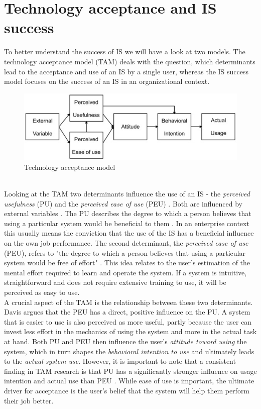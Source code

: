 \documentclass[
	english,
	ruledheaders=section,%
	class=report,%
	thesis={type=bachelor},%
	accentcolor=1b,%
	custommargins=true,%
	marginpar=false,%
	parskip=half-,%
	fontsize=11pt,%
	DIV=14,
]{tudapub}
\begin{document}
\section{Technology acceptance and IS success}
To better understand the success of IS we will have a look at two models. The technology acceptance model (TAM) \parencite{Davis1989} deals with the question, which determinants lead to the acceptance and use of an IS by a single user, whereas the IS success model \parencite{DeloneMcLean2003ISSuccessTenYearUpdate} focuses on the success of an IS in an organizational context.
\begin{figure}[h!]
    \includegraphics[width=1\linewidth]{images/TAM.png}
    \caption{Technology acceptance model}
    \label{fig:enter-label}
\end{figure}
\\
Looking at the TAM two determinants influence the use of an IS - the \textit{perceived usefulness} (PU) and the \textit{perceived ease of use} (PEU) \parencite{Davis1989}. Both are influenced by external variables \parencite{Davis1989}. The PU describes the degree to which a person believes that using a particular system would be beneficial to them \parencite{Davis1989}. In an enterprise context this usually means the conviction that the use of the IS has a beneficial influence on the own job performance. The second determinant, the \textit{perceived ease of use} (PEU), refers to "the degree to which a person believes that using a particular system would be free of effort" \parencite[p.~320]{Davis1989}. This idea relates to the user's estimation of the mental effort required to learn and operate the system. If a system is intuitive, straightforward and does not require extensive training to use, it will be perceived as easy to use.\\ A crucial aspect of the TAM is the relationship between these two determinants. Davis argues that the PEU has a direct, positive influence on the PU. A system that is easier to use is also perceived as more useful, partly because the user can invest less effort in the mechanics of using the system and more in the actual task at hand. Both PU and PEU then influence the user's \textit{attitude toward using} the system, which in turn shapes the \textit{behavioral intention to use} and ultimately leads to the \textit{actual system use}. However, it is important to note that a consistent finding in TAM research is that PU has a significantly stronger influence on usage intention and actual use than PEU \parencite{Davis1989}. While ease of use is important, the ultimate driver for acceptance is the user's belief that the system will help them perform their job better.\\
\end{document}
